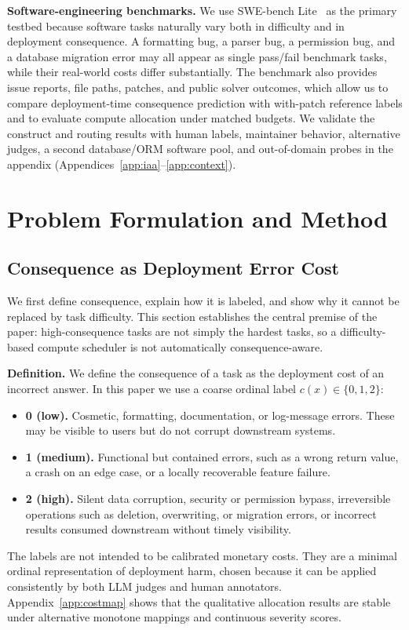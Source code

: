 \documentclass{article}
\begin{document}
\textbf{Software-engineering benchmarks.}
We use SWE-bench Lite~\citep{jimenez2023swebench} as the primary
testbed because software tasks naturally vary both in difficulty and
in deployment consequence. A formatting bug, a parser bug, a
permission bug, and a database migration error may all appear as
single pass/fail benchmark tasks, while their real-world costs differ
substantially. The benchmark also provides issue reports, file paths,
patches, and public solver outcomes, which allow us to compare
deployment-time consequence prediction with with-patch reference
labels and to evaluate compute allocation under matched budgets. We
validate the construct and routing results with human labels,
maintainer behavior, alternative judges, a second database/ORM
software pool, and out-of-domain probes in the appendix
(Appendices~\ref{app:iaa}--\ref{app:context}).
\section{Problem Formulation and Method}
\subsection{Consequence as Deployment Error Cost}
\label{sec:cons}

We first define consequence, explain how it is labeled, and show why it
cannot be replaced by task difficulty. This section establishes the
central premise of the paper: high-consequence tasks are not simply the
hardest tasks, so a difficulty-based compute scheduler is not
automatically consequence-aware.

\textbf{Definition.}
We define the consequence of a task as the deployment cost of an
incorrect answer. In this paper we use a coarse ordinal label
$c(x)\in\{0,1,2\}$:
\begin{itemize}\itemsep0pt
  \item \textbf{0 (low).} Cosmetic, formatting, documentation, or
  log-message errors. These may be visible to users but do not corrupt
  downstream systems.
  \item \textbf{1 (medium).} Functional but contained errors, such as
  a wrong return value, a crash on an edge case, or a locally
  recoverable feature failure.
  \item \textbf{2 (high).} Silent data corruption, security or
  permission bypass, irreversible operations such as deletion,
  overwriting, or migration errors, or incorrect results consumed
  downstream without timely visibility.
\end{itemize}
The labels are not intended to be calibrated monetary costs. They are
a minimal ordinal representation of deployment harm, chosen because it
can be applied consistently by both LLM judges and human annotators.
Appendix~\ref{app:costmap} shows that the qualitative allocation
results are stable under alternative monotone mappings and continuous
severity scores.
\end{document}
